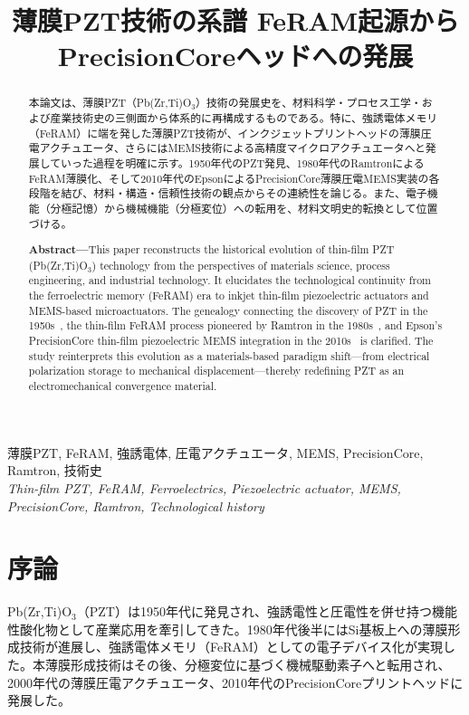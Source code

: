 \documentclass[conference]{IEEEtran}
\title{薄膜PZT技術の系譜 \Jemdash{} FeRAM起源からPrecisionCoreヘッドへの発展}
\author{%
  \IEEEauthorblockN{三溝 真一 (Shinichi Samizo)}%
  \IEEEauthorblockA{%
    独立系半導体研究者（元セイコーエプソン）\\%
    Independent Semiconductor Researcher (ex-Seiko Epson)\\[2pt]%
    Email:~\href{mailto:shin3t72@gmail.com}{shin3t72@gmail.com}\quad
    GitHub:~\url{https://github.com/Samizo-AITL}%
  }%
}
\date{}
\begin{document}
\maketitle

\begin{abstract}
本論文は、薄膜PZT（Pb(Zr,Ti)O$_3$）技術の発展史を、材料科学・プロセス工学・および産業技術史の三側面から体系的に再構成するものである。特に、強誘電体メモリ（FeRAM）に端を発した薄膜PZT技術が、インクジェットプリントヘッドの薄膜圧電アクチュエータ、さらにはMEMS技術による高精度マイクロアクチュエータへと発展していった過程を明確に示す。1950年代のPZT発見\cite{jaffe1954}、1980年代のRamtronによるFeRAM薄膜化\cite{ramtron_iedm1989,scott2000review}、そして2010年代のEpsonによるPrecisionCore薄膜圧電MEMS実装\cite{uemura2014mems}の各段階を結び、材料・構造・信頼性技術の観点からその連続性を論じる。また、電子機能（分極記憶）から機械機能（分極変位）への転用を、材料文明史的転換として位置づける。

\medskip
\textbf{Abstract—}This paper reconstructs the historical evolution of thin-film PZT (Pb(Zr,Ti)O$_3$) technology from the perspectives of materials science, process engineering, and industrial technology. It elucidates the technological continuity from the ferroelectric memory (FeRAM) era to inkjet thin-film piezoelectric actuators and MEMS-based microactuators. The genealogy connecting the discovery of PZT in the 1950s~\cite{jaffe1954}, the thin-film FeRAM process pioneered by Ramtron in the 1980s~\cite{ramtron_iedm1989,scott2000review}, and Epson’s PrecisionCore thin-film piezoelectric MEMS integration in the 2010s~\cite{uemura2014mems} is clarified. The study reinterprets this evolution as a materials-based paradigm shift—from electrical polarization storage to mechanical displacement—thereby redefining PZT as an electromechanical convergence material.
\end{abstract}

\begin{IEEEkeywords}
薄膜PZT, FeRAM, 強誘電体, 圧電アクチュエータ, MEMS, PrecisionCore, Ramtron, 技術史\\
\textit{Thin-film PZT, FeRAM, Ferroelectrics, Piezoelectric actuator, MEMS, PrecisionCore, Ramtron, Technological history}
\end{IEEEkeywords}

\section{序論}
Pb(Zr,Ti)O$_3$（PZT）は1950年代に発見され\cite{jaffe1954}、強誘電性と圧電性を併せ持つ機能性酸化物として産業応用を牽引してきた。1980年代後半にはSi基板上への薄膜形成技術が進展し、強誘電体メモリ（FeRAM）としての電子デバイス化が実現した\cite{ramtron_iedm1989}。本薄膜形成技術はその後、分極変位に基づく機械駆動素子へと転用され、2000年代の薄膜圧電アクチュエータ、2010年代のPrecisionCoreプリントヘッドに発展した\cite{uemura2014mems,epson_wp_precisioncore}。
\end{document}
